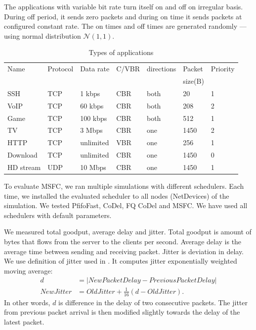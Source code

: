 The applications with variable bit rate turn itself on and off on irregular basis. During off period, it sends zero packets and during on time it sends packets at configured constant rate. The on times and off times are generated randomly --- using normal distribution $\mathcal{N}(1,1)$.

\begin{table}
	\caption{Types of applications}
	\label{tab01:traffic}
	\centering
	
	
	\begin{tabular}{@{}lllllll@{}}
		\toprule
		Name     & Protocol & Data rate & C/VBR   & directions & Packet         & Priority \\ 
		&          &           &         &            & size(B)        & \\ \midrule
		SSH      & TCP      & 1 kbps    & CBR     & both       & 20             & 1        \\
		VoIP     & TCP      & 60 kbps   & CBR     & both       & 208            & 2        \\
		Game     & TCP      & 100 kbps  & CBR     & both       & 512            & 1        \\
		TV       & TCP      & 3 Mbps    & CBR     & one        & 1450           & 2        \\
		HTTP     & TCP      & unlimited & VBR     & one        & 256            & 1        \\
		Download & TCP      & unlimited & CBR     & one        & 1450           & 0        \\
		HD stream& UDP      & 10 Mbps   & CBR     & one        & 1450           & 1        \\ \bottomrule
	\end{tabular}
\end{table}



To evaluate MSFC, we ran multiple simulations with different schedulers. Each time, we installed the evaluated scheduler to all nodes (NetDevices) of the simulation. We tested PfifoFast, CoDel, FQ CoDel and MSFC. We have used all schedulers with default parameters. 

We measured total goodput, average delay and jitter. Total goodput is amount of bytes that flows from the server to the clients per second. Average delay is the average time between sending and receiving packet. Jitter is deviation in delay. We use definition of jitter used in \cite{rfc1889}. It computes jitter exponentially weighted moving average:
\begin{align*} 
d &= |NewPacketDelay - PreviousPacketDelay| \\
NewJitter &= OldJitter + \frac{1}{16} (d - OldJitter).
\end{align*}
In other words, $d$ is difference in the delay of two consecutive packets. The jitter from previous packet arrival is then modified slightly towards the delay of the latest packet.

